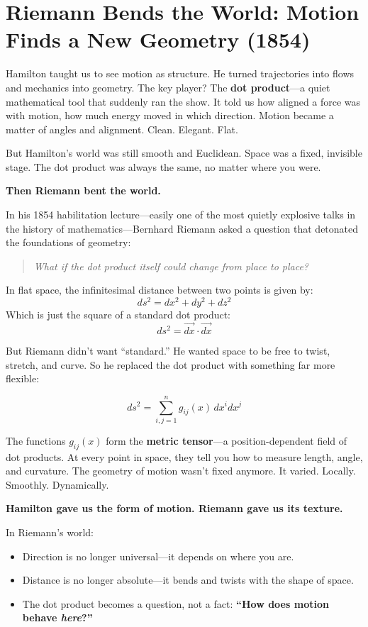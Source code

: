 \section{Riemann Bends the World: Motion Finds a New Geometry (1854)}

Hamilton taught us to see motion as structure. He turned trajectories into flows and mechanics into geometry. The key player? The \textbf{dot product}—a quiet mathematical tool that suddenly ran the show. It told us how aligned a force was with motion, how much energy moved in which direction. Motion became a matter of angles and alignment. Clean. Elegant. Flat.

But Hamilton’s world was still smooth and Euclidean. Space was a fixed, invisible stage. The dot product was always the same, no matter where you were. 

\textbf{Then Riemann bent the world.}

In his 1854 habilitation lecture—easily one of the most quietly explosive talks in the history of mathematics—Bernhard Riemann asked a question that detonated the foundations of geometry:

\begin{quote}
\textit{What if the dot product itself could change from place to place?}
\end{quote}

In flat space, the infinitesimal distance between two points is given by:
\[
ds^2 = dx^2 + dy^2 + dz^2
\]
Which is just the square of a standard dot product:
\[
ds^2 = \vec{dx} \cdot \vec{dx}
\]

But Riemann didn’t want “standard.” He wanted space to be free to twist, stretch, and curve. So he replaced the dot product with something far more flexible:

\[
ds^2 = \sum_{i,j=1}^n g_{ij}(x) \, dx^i dx^j
\]

The functions \( g_{ij}(x) \) form the \textbf{metric tensor}—a position-dependent field of dot products. At every point in space, they tell you how to measure length, angle, and curvature. The geometry of motion wasn’t fixed anymore. It varied. Locally. Smoothly. Dynamically.

\textbf{Hamilton gave us the form of motion. Riemann gave us its texture.}

In Riemann’s world:
\begin{itemize}
  \item Direction is no longer universal—it depends on where you are.
  \item Distance is no longer absolute—it bends and twists with the shape of space.
  \item The dot product becomes a question, not a fact: \textbf{“How does motion behave \emph{here}?”}
\end{itemize}

